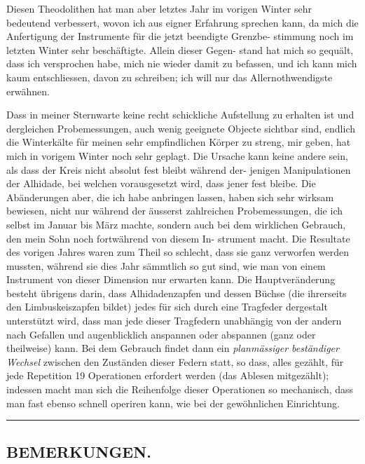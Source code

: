 \documentclass[12pt,a4paper]{article}
\theoremstyle{plain}
\theoremstyle{definition}
\theoremstyle{remark}
\begin{document}
Diesen Theodolithen hat man aber letztes Jahr im vorigen Winter sehr
bedeutend verbessert, wovon ich aus eigner Erfahrung sprechen kann, da
mich die Anfertigung der Instrumente für die jetzt beendigte Grenzbe-
stimmung noch im letzten Winter sehr beschäftigte. Allein dieser Gegen-
stand hat mich so gequält, dass ich versprochen habe, mich nie wieder damit
zu befassen, und ich kann mich kaum entschliessen, davon zu schreiben; ich
will nur das Allernothwendigste erwähnen.

Dass in meiner Sternwarte keine recht schickliche Aufstellung zu erhalten ist
und dergleichen Probemessungen, auch wenig geeignete Objecte sichtbar sind,
endlich die Winterkälte für meinen sehr empfindlichen Körper zu streng, mir
geben, hat mich in vorigem Winter noch sehr geplagt. Die Ursache kann
keine andere sein, als dass der Kreis nicht absolut fest bleibt während der-
jenigen Manipulationen der Alhidade, bei welchen vorausgesetzt wird, dass
jener fest bleibe. Die Abänderungen aber, die ich habe anbringen lassen,
haben sich sehr wirksam bewiesen, nicht nur während der äusserst zahlreichen
Probemessungen, die ich selbst im Januar bis März machte, sondern auch bei
dem wirklichen Gebrauch, den mein Sohn noch fortwährend von diesem In-
strument macht. Die Resultate des vorigen Jahres waren zum Theil so
schlecht, dass sie ganz verworfen werden mussten, während sie dies Jahr
sämmtlich so gut sind, wie man von einem Instrument von dieser Dimension
nur erwarten kann. Die Hauptveränderung besteht übrigens darin, dass
Alhidadenzapfen und dessen Büchse (die ihrerseits den Limbuskeiszapfen
bildet) jedes für sich durch eine Tragfeder dergestalt unterstützt wird, dass
man jede dieser Tragfedern unabhängig von der andern nach Gefallen und
augenblicklich anspannen oder abspannen (ganz oder theilweise) kann. Bei
dem Gebrauch findet dann ein \textit{planmässiger beständiger Wechsel} zwischen
den Zuständen dieser Federn statt, so dass, alles gezählt, für jede Repetition
19 Operationen erfordert werden (das Ablesen mitgezählt); indessen macht
man sich die Reihenfolge dieser Operationen so mechanisch, dass man fast
ebenso schnell operiren kann, wie bei der gewöhnlichen Einrichtung.

\vspace{1em}
\begin{center}
\rule{0.5\textwidth}{0.4pt}
\end{center}

\subsection*{BEMERKUNGEN.}
\end{document}
